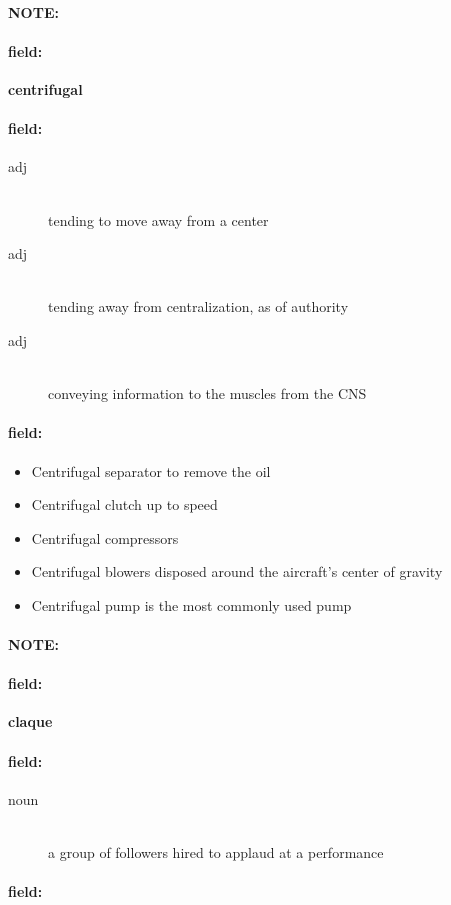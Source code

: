 \documentclass[12pt]{article}
\newenvironment{note}{\paragraph{NOTE:}}{}
\newenvironment{field}{\paragraph{field:}}{}
\begin{document}
\begin{note}
\begin{field}
\textbf{\large centrifugal}
\end{field}


\begin{field}
\begin{description}
\item[adj] \hfill \\ 
tending to move away from a center

\item[adj] \hfill \\ 
tending away from centralization, as of authority

\item[adj] \hfill \\ 
conveying information to the muscles from the CNS

\end{description}
\end{field}

\begin{field}
\begin{itemize}
\item Centrifugal separator to remove the oil
\item Centrifugal clutch up to speed
\item Centrifugal compressors
\item Centrifugal blowers disposed around the aircraft's center of gravity
\item Centrifugal pump is the most commonly used pump
\end{itemize}
\end{field}
\end{note}
\begin{note}
\begin{field}
\textbf{\large claque}
\end{field}


\begin{field}
\begin{description}
\item[noun] \hfill \\ 
a group of followers hired to applaud at a performance

\end{description}
\end{field}

\begin{field}
\end{field}
\end{note}
\end{document}
